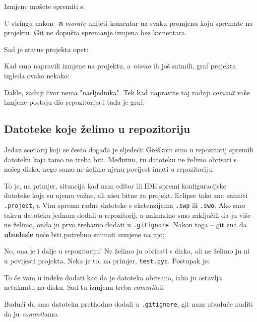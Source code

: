Izmjene možete spremiti s:


U stringu nakon \verb+-m+ \emph{morate} unijeti komentar uz svaku promjenu koju spremate na projektu.
Git ne dopušta spremanje izmjena bez komentara.

Sad je status projekta opet:



Kad smo napravili izmjene na projektu, a \emph{nismo} ih još snimili, graf projekta izgleda ovako nekako:



Dakle, zadnji čvor nema "nasljednika".
Tek kad napravite taj zadnji \emph{commit} vaše izmjene postaju dio repozitorija i tada je graf:



\subsection*{Datoteke koje želimo u repozitoriju}

Jedan scenarij koji se često događa je sljedeći:
Greškom smo u repozitorij spremili datoteku koja tamo ne treba biti. 
Međutim, tu datoteku ne želimo obrisati s našeg diska, nego samo ne želimo njenu povijest imati u repozitoriju.

To je, na primjer, situacija kad nam editor ili IDE spremi konfiguracijske datoteke koje su njemu važne, ali nisu bitne za projekt.
Eclipse tako zna snimiti \verb+.project+, a Vim sprema radne datoteke s ekstenzijama \verb+.swp+ ili \verb+.swo+.
Ako smo takvu datoteku jednom dodali u repozitorij, a naknadno smo zaključili da ju više ne želimo, onda ju prvo trebamo dodati u \verb+.gitignore+.
Nakon toga -- git zna da \textbf{ubuduće} neće biti potrebno snimati izmjene na njoj.

No, ona je i dalje u repozitoriju!
Ne želimo ju obrisati s diska, ali ne želimo ju ni u povijesti projekta.
Neka je to, na primjer, \verb+test.pyc+.
Postupak je:


To će vam u indeks dodati kao da je datoteka obrisana, iako ju ostavlja netaknutu na disku.
Sad tu izmjenu treba \emph{commit}ati

Budući da smo datoteku prethodno dodali u \verb+.gitignore+, git nam ubuduće nuditi da ju \emph{commit}amo.

